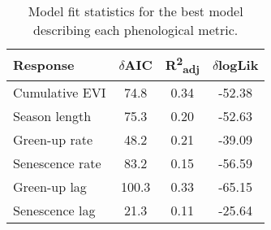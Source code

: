 \begin{table}[h]
\caption[Model fit statistics]{Model fit statistics for the best model describing each phenological metric.} 
\label{phen:mod_stat}
\begin{tabular}{lS[table-format=3.1]S[table-format=1.2]S[table-format=-2.2]}
  \toprule
  {Response} & {$\delta$AIC} & {R\textsuperscript{2}\textsubscript{adj}} & {$\delta$logLik} \\ 
  \midrule
Cumulative EVI & 74.8 & 0.34 & -52.38 \\ 
  Season length & 75.3 & 0.20 & -52.63 \\ 
  Green-up rate & 48.2 & 0.21 & -39.09 \\ 
  Senescence rate & 83.2 & 0.15 & -56.59 \\ 
  Green-up lag & 100.3 & 0.33 & -65.15 \\ 
  Senescence lag & 21.3 & 0.11 & -25.64 \\ 
   \bottomrule
\end{tabular}
\end{table}

